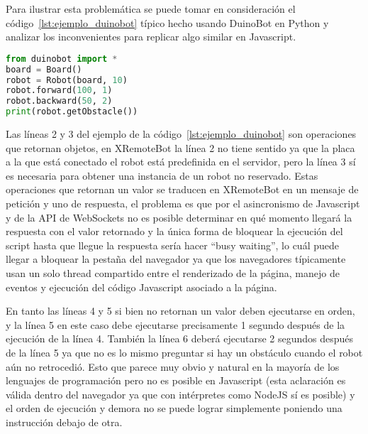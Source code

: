 Para ilustrar esta problemática se puede tomar en consideración el
código~\ref{lst:ejemplo_duinobot}
típico hecho usando DuinoBot en Python y analizar los inconvenientes para replicar
algo similar en Javascript.

\begin{lstlisting}[language=Python,
caption={Ejemplo típico usando DuinoBot},label=lst:ejemplo_duinobot]
from duinobot import *
board = Board()
robot = Robot(board, 10)
robot.forward(100, 1)
robot.backward(50, 2)
print(robot.getObstacle())
\end{lstlisting}


Las líneas 2 y 3 del ejemplo de la código~\ref{lst:ejemplo_duinobot} son
operaciones que retornan objetos, en XRemoteBot la línea 2 no tiene sentido
ya que la placa a la que está conectado el robot está predefinida en el
servidor, pero la línea 3 sí es necesaria para obtener una instancia de un
robot no reservado. Estas operaciones que retornan un valor se traducen en
XRemoteBot en
un mensaje de petición y uno de respuesta, el problema
es que por el asincronismo de Javascript y de la API de WebSockets no
es posible determinar en qué momento llegará la respuesta con el valor
retornado y la única forma de bloquear la ejecución del script hasta que
llegue la respuesta sería hacer ``busy waiting'', lo cuál puede llegar a
bloquear la pestaña del navegador ya que los navegadores típicamente usan
un solo thread compartido entre el renderizado de la página, manejo de
eventos y ejecución del código Javascript asociado a la página.

En tanto las líneas 4 y 5 si bien no retornan un valor deben ejecutarse
en orden, y la línea 5 en este caso debe ejecutarse precisamente 1 segundo
después de la ejecución de la línea 4. También la línea 6 deberá ejecutarse
2 segundos después de la línea 5 ya que no es lo mismo preguntar si hay
un obstáculo cuando el robot aún no retrocedió. Esto que parece muy obvio
y natural en la mayoría de los lenguajes de programación pero no es posible
en Javascript (esta aclaración es válida dentro del navegador ya que
con intérpretes como NodeJS sí es
posible) y el orden de ejecución y demora no se puede lograr simplemente
poniendo una instrucción debajo de otra.


